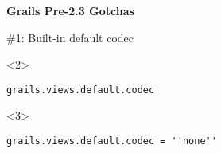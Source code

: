 {

\begin{frame}[plain]
    \begin{center}
      \Huge\bfseries
      Grails Pre-2.3 Gotchas
    \end{center}
\end{frame}


\begin{frame}

    \vspace{.5cm}

    \begin{center}
      \Huge\color{red} \#1: Built-in default codec \\
    \end{center}

    \vspace{1cm}

    \begin{onlyenv}<2>
    \begin{center}
      \begin{minipage}{.9\textwidth}
        \begin{verbatim}
grails.views.default.codec
        \end{verbatim}
      \end{minipage}
    \end{center}
    \end{onlyenv}

    \begin{onlyenv}<3>
    \begin{center}
      \begin{minipage}{.9\textwidth}
        \begin{verbatim}
grails.views.default.codec = ''none''
        \end{verbatim}
      \end{minipage}
    \end{center}
    \end{onlyenv}

\end{frame}

\begin{frame}

    \vspace{.5cm}


\end{frame}}
